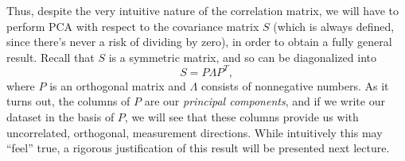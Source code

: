 \documentclass[letterpaper]{article}
\theoremstyle{remark}
\begin{document}
Thus, despite the very intuitive nature of the correlation matrix, we will have to perform PCA with respect to the covariance matrix $S$ (which is always defined, since there's never a risk of dividing by zero), in order to obtain a fully general result. Recall that $S$ is a symmetric matrix, and so can be diagonalized into
\[
    S = P\Lambda P^T,
\]
where $P$ is an orthogonal matrix and $\Lambda$ consists of nonnegative numbers. As it turns out, the columns of $P$ are our \emph{principal components}, and if we write our dataset in the basis of $P$, we will see that these columns provide us with uncorrelated, orthogonal, measurement directions. While intuitively this may ``feel'' true, a rigorous justification of this result will be presented next lecture.
\end{document}

